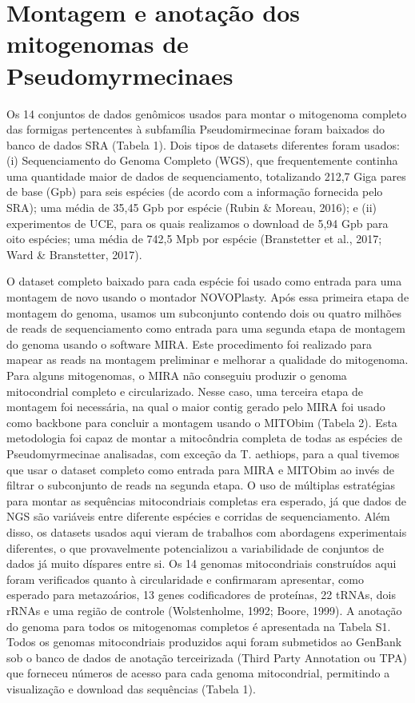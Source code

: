 \documentclass[../DISSERTACAO_MAIN.tex]{subfiles}
\begin{document}
	
\section{Montagem e anotação dos mitogenomas de Pseudomyrmecinaes}
	
	Os 14 conjuntos de dados genômicos usados para montar o mitogenoma completo das formigas pertencentes à subfamília Pseudomirmecinae foram baixados do banco de dados SRA (Tabela 1). Dois tipos de datasets diferentes foram usados: (i) Sequenciamento do Genoma Completo (WGS), que frequentemente continha uma quantidade maior de dados de sequenciamento, totalizando 212,7 Giga pares de base (Gpb) para seis espécies (de acordo com a informação fornecida pelo SRA); uma média de 35,45 Gpb por espécie (Rubin \& Moreau, 2016); e (ii) experimentos de UCE, para os quais realizamos o download  de 5,94 Gpb para oito espécies; uma média de 742,5 Mpb por espécie (Branstetter et al., 2017; Ward \& Branstetter, 2017).
	
	O dataset completo baixado para cada espécie foi usado como entrada para uma montagem de novo usando o montador NOVOPlasty. Após essa primeira etapa de montagem do genoma, usamos um subconjunto contendo dois ou quatro milhões de reads de sequenciamento como entrada para uma segunda etapa de montagem do genoma usando o software MIRA. Este procedimento foi realizado para mapear as reads na montagem preliminar e melhorar a qualidade do mitogenoma. Para alguns mitogenomas, o MIRA não conseguiu produzir o genoma mitocondrial completo e circularizado. Nesse caso, uma terceira etapa de montagem foi necessária, na qual o maior contig gerado pelo MIRA foi usado como backbone para concluir a montagem usando o MITObim (Tabela 2). Esta metodologia foi capaz de montar a mitocôndria completa de todas as espécies de Pseudomyrmecinae analisadas, com exceção da T. aethiops, para a qual tivemos que usar o dataset completo como entrada para MIRA e MITObim ao invés de filtrar o subconjunto de reads na segunda etapa. O uso de múltiplas estratégias para montar as sequências mitocondriais completas era esperado, já que dados de NGS são variáveis entre diferente espécies e corridas de sequenciamento. Além disso, os datasets usados aqui vieram de trabalhos com abordagens experimentais diferentes, o que provavelmente potencializou a variabilidade de conjuntos de dados já muito díspares entre si. Os 14 genomas mitocondriais construídos aqui foram verificados quanto à circularidade e confirmaram apresentar, como esperado para metazoários, 13 genes codificadores de proteínas, 22 tRNAs, dois rRNAs e uma região de controle (Wolstenholme, 1992; Boore, 1999). A anotação do genoma para todos os mitogenomas completos é apresentada na Tabela S1. Todos os genomas mitocondriais produzidos aqui foram submetidos ao GenBank sob o banco de dados de anotação terceirizada (Third Party Annotation ou TPA) \cite{Cochrane2006} que forneceu números de acesso para cada genoma mitocondrial, permitindo a visualização e download das sequências (Tabela 1). 
	
\end{document}
